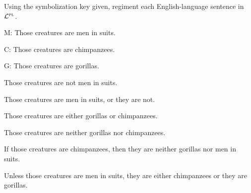 \iffalse

\practiceproblems

\solutions
\problempart Using the symbolization key given, regiment each English-language sentence in $\mathcal{L}^{\textsc{pl}}$.
\label{pr.monkeysuits}
\begin{ekey}
\item[M:] Those creatures are men in suits. 
\item[C:] Those creatures are chimpanzees. 
\item[G:] Those creatures are gorillas.
\end{ekey}
\begin{earg}
\item Those creatures are not men in suits.
\item Those creatures are men in suits, or they are not.
\item Those creatures are either gorillas or chimpanzees.
\item Those creatures are neither gorillas nor chimpanzees.
\item If those creatures are chimpanzees, then they are neither gorillas nor men in suits.
\item Unless those creatures are men in suits, they are either chimpanzees or they are gorillas.
\end{earg}


